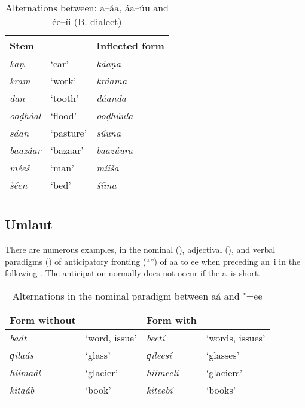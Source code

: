 \begin{table}[ht]
\caption{Alternations between: a--áa, áa--úu and ée--íi (B. dialect)}
\begin{tabularx}{\textwidth}{ Q Q Q }
\lsptoprule
Stem &
&
Inflected form\\\hline
\textit{kaṇ} &
`ear' &
\textit{káaṇa} \\
\textit{kram} &
`work' &
\textit{kráama} \\
\textit{dan} &
`tooth' &
\textit{dáanda} \\
\textit{ooḍháal} &
`flood' &
\textit{ooḍhúula} \\
\textit{sáan} &
`pasture' &
\textit{súuna} \\
\textit{baazáar} &
`bazaar' &
\textit{baazúura} \\
\textit{méeš} &
`man' &
\textit{míiša} \\
\textit{šéen} &
`bed' &
\textit{šíina} \\\lspbottomrule
\end{tabularx}
\label{tab:3-15}
\end{table}

\subsection{Umlaut}
\label{subsec:3-5-3}

There are numerous examples, in the nominal (), adjectival (), and verbal paradigms () of anticipatory fronting (``'') of aa to ee when preceding an~i in the following . The anticipation normally does not occur if the a~is short. 


\begin{table}[ht]
\caption{Alternations in the nominal paradigm between aá and "=ee}
\begin{tabularx}{\textwidth}{ Q Q Q Q }
\lsptoprule
Form without  &
&
Form with  &
\\\hline
\textit{baát} &
`word, issue' &
\textit{beetí} &
`words, issues'\\
\textit{ɡilaás} &
`glass' &
\textit{ɡileesí} &
`glasses'\\
\textit{hiimaál} &
`glacier' &
\textit{hiimeelí} &
`glaciers'\\
\textit{kitaáb} &
`book' &
\textit{kiteebí} &
`books'\\\lspbottomrule
\end{tabularx}
\label{tab:3-16}
\end{table}


